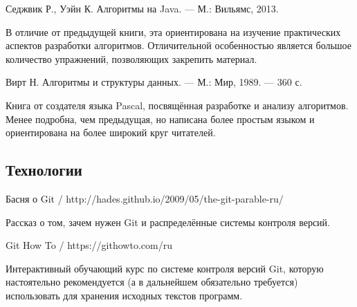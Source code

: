 \begin{thebibliography}{99}
  Седжвик Р., Уэйн К. Алгоритмы на Java. — М.: Вильямс, 2013.

  В отличие от предыдущей книги, эта ориентирована на изучение
  практических аспектов разработки алгоритмов. Отличительной
  особенностью является большое количество упражнений, позволяющих
  закрепить материал.
  
  Вирт Н. Алгоритмы и структуры данных. — М.: Мир, 1989. — 360 с.

  Книга от создателя языка Pascal, посвящённая разработке и анализу
  алгоритмов. Менее подробна, чем предыдущая, но написана более
  простым языком и ориентирована на более широкий круг читателей.

\subsection*{Технологии}

  Басня о Git / http://hades.github.io/2009/05/the-git-parable-ru/
  
  Рассказ о том, зачем нужен Git и распределённые системы контроля версий.

  Git How To / https://githowto.com/ru

  Интерактивный обучающий курс по системе контроля версий Git, которую
  настоятельно рекомендуется (а в дальнейшем обязательно требуется)
  использовать для хранения исходных текстов программ.
\end{thebibliography}
\endgroup
